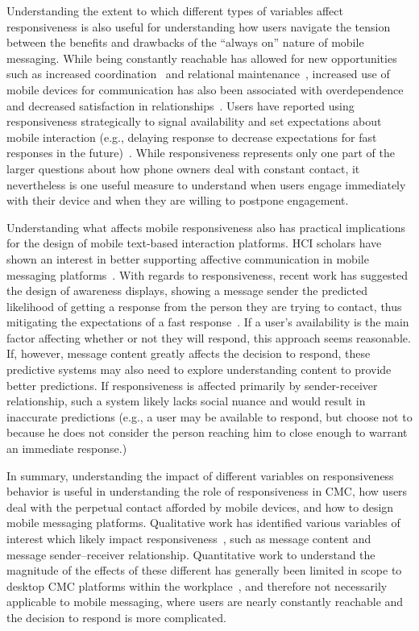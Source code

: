 \documentclass[12pt]{nuthesis}	%
\begin{document}
Understanding the extent to which different types of variables affect responsiveness is also useful for understanding how users navigate the tension between the benefits and drawbacks of the ``always on'' nature of mobile messaging. While being constantly reachable has allowed for new opportunities such as increased coordination~\citep{ling200210} and relational maintenance~\citep{pettegrew2015smart}, increased use of mobile devices for communication has also been associated with overdependence and decreased satisfaction in relationships~\citep{hall2012calling}. Users have reported using responsiveness strategically to signal availability and set expectations about mobile interaction (e.g., delaying response to decrease expectations for fast responses in the future)~\citep{ames2013managing,wohn2015ambient}. While responsiveness represents only one part of the larger questions about how phone owners deal with constant contact, it nevertheless is one useful measure to understand when users engage immediately with their device and when they are willing to postpone engagement.

Understanding what affects mobile responsiveness also has practical implications for the design of mobile text-based interaction platforms. HCI scholars have shown an interest in better supporting affective communication in mobile messaging platforms~\citep[e.g.][]{amin2005sensems}. With regards to responsiveness, recent work has suggested the design of awareness displays, showing a message sender the predicted likelihood of getting a response from the person they are trying to contact, thus mitigating the expectations of a fast response~\citep{pielot2014didn}. If a user's availability is the main factor affecting whether or not they will respond, this approach seems reasonable. If, however, message content greatly affects the decision to respond, these predictive systems may also need to explore understanding content to provide better predictions. If responsiveness is affected primarily by sender-receiver relationship, such a system likely lacks social nuance and would result in inaccurate predictions (e.g., a user may be available to respond, but choose not to because he does not consider the person reaching him to close enough to warrant an immediate response.)

In summary, understanding the impact of different variables on responsiveness behavior is useful in understanding the role of responsiveness in CMC, how users deal with the perpetual contact afforded by mobile devices, and how to design mobile messaging platforms. Qualitative work has identified various variables of interest which likely impact responsiveness~\citep[e.g.][]{church2013s,wohn2015ambient}, such as message content and message sender--receiver relationship. Quantitative work to understand the magnitude of the effects of these different has generally been limited in scope to desktop CMC platforms within the workplace~\citep[e.g.][]{avrahami2006responsiveness,dabbish2005understanding}, and therefore not necessarily applicable to mobile messaging, where users are nearly constantly reachable and the decision to respond is more complicated.
\end{document}

